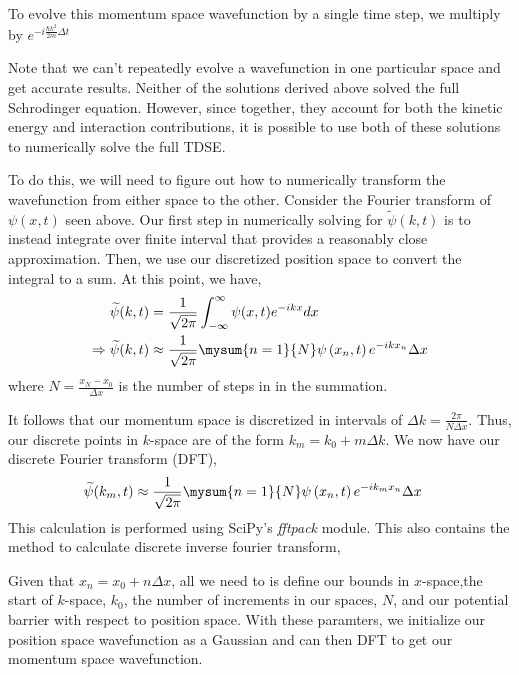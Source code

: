 \documentclass{booknotes}
\begin{document}
To evolve this momentum space wavefunction by a single time step, we multiply by
$e^{-i \frac { \hbar k ^ { 2 } } { 2 m }  \Delta t}$





Note that we can't repeatedly evolve a wavefunction in one particular space and get accurate results. Neither of the solutions derived above solved the full Schrodinger equation. However, since together, they account for both the kinetic energy and interaction contributions, it is possible to use both of these solutions to numerically solve the full TDSE. 

To do this, we will need to figure out how to numerically transform the wavefunction from either space to the other. Consider the Fourier transform of $\psi(x,t)$ seen above.
Our first step in numerically solving for $\widetilde { \psi } (k,t)$ is to instead integrate over finite interval that provides a reasonably close approximation.
Then, we use our discretized position space to convert the integral to a sum.
At this point, we have,
	\begin{align}
	\widetilde { \psi } ( k , t ) &= \frac { 1 } { \sqrt { 2 \pi } } \int _ { - \infty } ^ { \infty } \psi ( x , t ) e ^ { - i k x } d x\\
	\Rightarrow \widetilde { \psi } ( k , t ) &\approx 
	 \frac { 1 } { \sqrt { 2 \pi } } \mysum { n=1}{N} \psi \left( x _ { n } , t \right) e ^ { - i k x _ { n } } \Delta x
	\end{align}
where $N = \frac{x_N-x_0}{\Delta x}$ is the number of steps in in the summation.

It follows that our momentum space is discretized in intervals of $\Delta k=\frac{2\pi}{N \Delta x}$.
Thus, our discrete points in $k$-space are of the form $k_m = k_0 + m\Delta k$.
We now have our discrete Fourier transform (DFT),
	\begin{align}
	 \widetilde { \psi } ( k_m , t ) &\approx 
	 \frac { 1 } { \sqrt { 2 \pi } }  \mysum { n=1}{N} \psi \left( x _ { n } , t \right) e ^ { - i k_m x _ { n } } \Delta x
	\end{align}
This calculation is performed using SciPy's \textit{fftpack} module.
This also contains the method to calculate discrete inverse fourier transform,

	
Given that $x_n = x_0+n \Delta x$, all we need to is define our bounds in $x$-space,the start of $k$-space, $k_0$, the number of increments in our spaces, $N$, and our potential barrier with respect to position space.
With these paramters, we initialize our position space wavefunction as a Gaussian and can then DFT to get our momentum space wavefunction.
\end{document}
